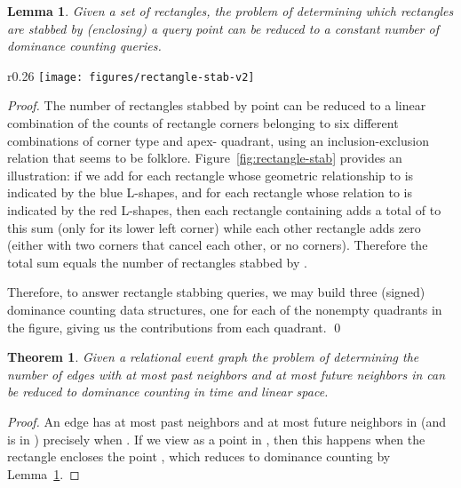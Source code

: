 \documentclass[11pt]{article}
\newtheorem{lemma}{Lemma}
\newtheorem{theorem}{Theorem}
\begin{document}
\begin{lemma}\label{lem:rectangle-stabbing}
Given a set of rectangles, the problem of determining which rectangles are stabbed by (enclosing) a query point can be reduced to a constant number of dominance counting queries.
\end{lemma}

\begin{wrapfigure}[13]{r}{0.26\textwidth}
\vspace{-1em}
\centering
\texttt{[image: figures/rectangle-stab-v2]}
\vspace{-1em}
\caption{Turning stabbing into dominance.}
\label{fig:rectangle-stab}
\vspace{-2em}
\end{wrapfigure}
\noindent\emph{Proof.}
The number of rectangles stabbed by point  can be reduced to a linear combination of the counts of rectangle corners belonging to six different combinations of  corner type and apex- quadrant, using an inclusion-exclusion relation that seems to be folklore.
Figure~\ref{fig:rectangle-stab} provides an illustration: if we add  for each rectangle whose geometric relationship to  is indicated by the blue L-shapes, and  for each rectangle whose relation to  is indicated by the red L-shapes, then each rectangle containing  adds a total of  to this sum (only for its lower left corner) while each other rectangle adds zero (either with two corners that cancel each other, or no corners). Therefore the total sum equals the number of rectangles stabbed by .

Therefore, to answer rectangle stabbing queries, we may build three (signed) dominance counting data structures,  one for each of the nonempty quadrants in the figure, giving us the contributions from each quadrant. \qed

\begin{theorem}\label{thm:future-past}
Given a relational event graph  the problem of determining the number of edges with at most  past neighbors and at most  future neighbors in  can be reduced to dominance counting in  time and linear space.
\end{theorem}
\begin{proof}
An edge  has at most  past neighbors and at most  future neighbors in  (and is in ) precisely when .
If we view  as a point in , then this happens when the rectangle  encloses the point , which reduces to dominance counting by Lemma~\ref{lem:rectangle-stabbing}.
\end{proof}
\end{document}
